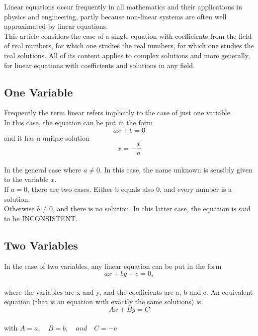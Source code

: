 \documentclass[a4paper, 12pt]{report}
\begin{document}
{           Linear equations occur frequently in all mathematics and their applications in physics and engineering, partly because non-linear systems are often well approximated by linear equations.\\
           This article considers the case of a single equation with coefficients from the field of real numbers, for which one studies the real numbers, for which one studies the real solutions. All of its content applies to complex solutions and more generally, for linear equations with coefficients and solutions in any field.\\
           
           \subsection{One Variable}
           Frequently the term linear refers implicitly to the case of just one variable.\\
           In this case, the equation can be put in the form
           \begin{equation}
           ax + b = 0
           \end{equation}    
           and it has a unique solution
           \begin{equation}
           x =  - \frac{x}{a}
          \end{equation}\\
          
         In the general case where $a \neq 0$. In this case, the name unknown is sensibly given to the variable $x$.\\
         
         If $a = 0$, there are two cases. Either b equals also 0, and every number is a solution.\\
         Otherwise $b \neq 0$, and there is no solution. In this latter case, the equation is said to be INCONSISTENT.\\
         
         \subsection{Two Variables}
         In the case of two variables, any linear equation can be put in the form 
         \begin{equation}
         ax + by + c = 0,
         \end{equation} \\
         where the variables are x and y, and the coefficients are a, b and c.
         An equivalent equation (that is an equation with exactly the same solutions) is
         \begin{equation}
         Ax + By = C
         \end{equation}\\
         with $A = a, \quad B = b, \quad and \quad C = -c $\\
         
}
\end{document}
